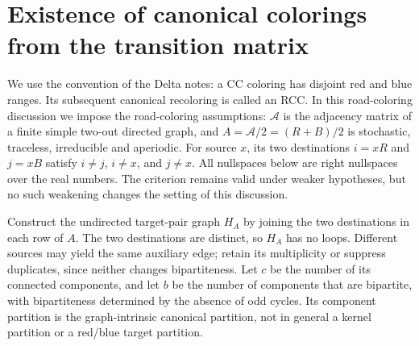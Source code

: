 \section{Existence of canonical colorings from the transition matrix}
\label{cc-exist:section}

We use the convention of the Delta notes: a CC coloring has disjoint red
and blue ranges. Its subsequent canonical recoloring is called an RCC.
In this road-coloring discussion we impose the road-coloring assumptions: $\mathcal A$ is the adjacency
matrix of a finite simple two-out directed graph, and
$A=\mathcal A/2=(R+B)/2$ is stochastic, traceless, irreducible and
aperiodic. For source $x$, its two destinations $i=xR$ and $j=xB$ satisfy
$i\ne j$, $i\ne x$, and $j\ne x$. All nullspaces below are right
nullspaces over the real numbers. The criterion remains valid under weaker
hypotheses, but no such weakening changes the setting of this discussion.

Construct the undirected target-pair graph $H_A$ by joining the two
destinations in each row of $A$. The two destinations are distinct, so $H_A$ has no loops.
Different sources may yield the same auxiliary edge; retain its multiplicity
or suppress duplicates, since neither changes bipartiteness.
Let $c$ be the number of its connected components, and let $b$ be the
number of components that are bipartite, with bipartiteness determined by the absence of odd cycles.
Its component partition is the graph-intrinsic canonical partition, not
in general a kernel partition or a red/blue target partition.

